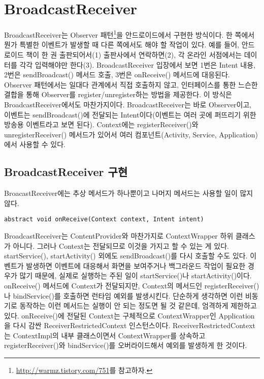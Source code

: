 \chapter{BroadcastReceiver}
BroadcastReceiver는 Observer 패턴\footnote{\url{http://warmz.tistory.com/751}를 참고하자.}을 안드로이드에서 구현한 방식이다.
한 쪽에서 뭔가 특별한 이벤트가 발생할 때 다른 쪽에서도 해야 할 작업이 있다.
예를 들어, 안드로이드 책이 한 권 출판되어서(1) 출판사에서 연락하면(2), 각 온라인 서점에서는 데이터를 각각 입력해야만 한다(3). BroadcastReceiver 입장에서 보면 1번은 Intent 내용, 2번은 sendBroadcast() 메서드 호출, 3번은 onReceive() 메서드에 대응된다.\\

Observer 패턴에서는 일대다 관계에서 직접 호출하지 않고, 인터페이스를 통한 느슨한 결합을 통해 Observer를 register/unregister하는 방법을 제공한다.
이 방식은 BroadcastReceiver에서도 마찬가지이다. BroadcastReceiver는 바로 Observer이고, 이벤트는 sendBroadcast()에 전달되는 Intent이다(이벤트는 여러 곳에 퍼뜨리기 위한 방송용 이벤트라고 보면 된다). Context에는 registerReceiver()와 unregisterReceiver() 메서드가 있어서 여러 컴포넌트(Activity, Service, Application)에서 사용할 수 있다.

\section{BroadcastReceiver 구현}
BroacastReceiver에는 추상 메서드가 하나뿐이고 나머지 메서드는 사용할 일이 많지 않다.
\begin{lstlisting}[frame=single] 
	abstract void onReceive(Context context, Intent intent)
\end{lstlisting}

BroadcastReceiver는 ContentProvider와 마찬가지로 ContextWrapper 하위 클래스가 아니다. 그러나 Context는 전달되므로 이것을 가지고 할 수 있는 게 있다.
startService(), startActivity() 외에도 sendBroadcast()를 다시 호출할 수도 있다. 
이벤트가 발생하면 이벤트에 대응해서 화면을 보여주거나 백그라운드 작업이 필요한 경우가 많기 때문에, 실제로 실행하는 주된 일이 startService()나 startActivity()이다.\\

onReceive() 메서드에 Context가 전달되지만, Context의 메서드인 registerReceiver()나 bindService()를 호출하면 런타임 예외를 발생시킨다. 단순하게 생각하면 이런 비동기로 동작하는 이런 메서드는 실행이 안 되는 정도면 될 것 같은데, 엄격하게 제한하고 있다. onReceive()에 전달된 Context는 구체적으로 ContextWrapper인 Application을 다시 감싼 ReceiverRestrictedContext 인스턴스이다. ReceiverRestrictedContext는 ContextImpl의 내부 클래스이면서 ContextWrapper를 상속하고 registerReceiver()와 bindService()를 오버라이드해서 예외를 발생하게 한 것이다.\\

